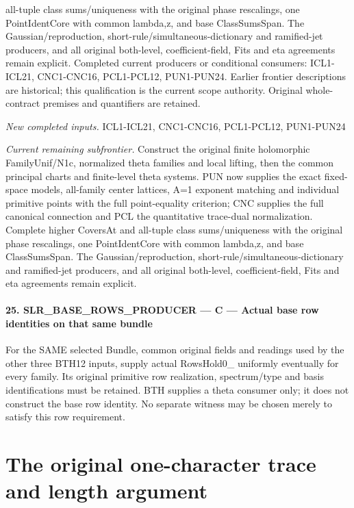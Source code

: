 \documentclass[11pt,a4paper]{article}
\numberwithin{equation}{section}
\theoremstyle{remark}\newtheorem{remark}[theorem]{Remark}
\begin{document}
all-tuple class sums/uniqueness with the original phase rescalings, one PointIdentCore with common lambda,z, and base ClassSumsSpan. The Gaussian/reproduction, short-rule/simultaneous-dictionary and ramified-jet producers, and all original both-level, coefficient-field, Fits and eta agreements remain explicit. Completed current producers or conditional consumers: ICL1-ICL21, CNC1-CNC16, PCL1-PCL12, PUN1-PUN24. Earlier frontier descriptions are historical; this qualification is the current scope authority. Original whole-contract premises and quantifiers are retained.

\emph{New completed inputs.} ICL1-ICL21, CNC1-CNC16, PCL1-PCL12, PUN1-PUN24

\emph{Current remaining subfrontier.} Construct the original finite holomorphic FamilyUnif/N1c, normalized theta families and local lifting, then the common principal charts and finite-level theta systems. PUN now supplies the exact fixed-space models, all-family center lattices, A=1 exponent matching and individual primitive points with the full point-equality criterion; CNC supplies the full canonical connection and PCL the quantitative trace-dual normalization. Complete higher CoversAt and all-tuple class sums/uniqueness with the original phase rescalings, one PointIdentCore with common lambda,z, and base ClassSumsSpan. The Gaussian/reproduction, short-rule/simultaneous-dictionary and ramified-jet producers, and all original both-level, coefficient-field, Fits and eta agreements remain explicit.



\paragraph{25. SLR\_\allowbreak BASE\_\allowbreak ROWS\_\allowbreak PRODUCER — C — Actual base row identities on that same bundle}

For the SAME selected Bundle, common original fields and readings used by the other three BTH12 inputs, supply actual RowsHold0\_ uniformly eventually for every family. Its original primitive row realization, spectrum/type and basis identifications must be retained. BTH supplies a theta consumer only; it does not construct the base row identity. No separate witness may be chosen merely to satisfy this row requirement.



\clearpage
\section{The original one-character trace and length argument}
\label{sec:one-character-v48}
\end{document}
